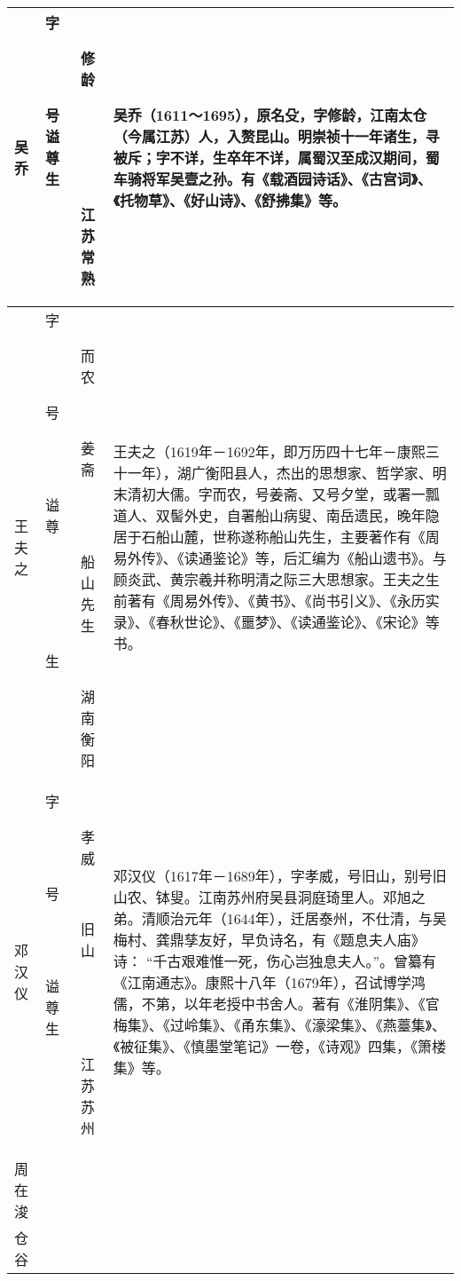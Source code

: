 \begin{longtable}{|>{\centering\namefont\heiti}m{2em}|>{\centering\tiny}m{3.0em}|>{\xzfont\kaiti}m{7.3em}|}
  吴乔 & \begin{description}
  \item[字] 修龄
  \item[号] 
  \item[谥] 
  \item[尊] 
  \item[生] 江苏常熟
  \end{description} & 吴乔（1611～1695），原名殳，字修龄，江南太仓（今属江苏）人，入赘昆山。明崇祯十一年诸生，寻被斥；字不详，生卒年不详，属蜀汉至成汉期间，蜀车骑将军吴壹之孙。有《载酒园诗话》、《古宫词》、《托物草》、《好山诗》、《舒拂集》等。 \tabularnewline\hline
  王夫之 & \begin{description}
  \item[字] 而农
  \item[号] 姜斋
  \item[谥] 
  \item[尊] 船山先生
  \item[生] 湖南衡阳
  \end{description} & 王夫之（1619年－1692年，即万历四十七年－康熙三十一年），湖广衡阳县人，杰出的思想家、哲学家、明末清初大儒。字而农，号姜斋、又号夕堂，或署一瓢道人、双髻外史，自署船山病叟、南岳遗民，晚年隐居于石船山麓，世称遂称船山先生，主要著作有《周易外传》、《读通鉴论》等，后汇编为《船山遗书》。与顾炎武、黄宗羲并称明清之际三大思想家。王夫之生前著有《周易外传》、《黄书》、《尚书引义》、《永历实录》、《春秋世论》、《噩梦》、《读通鉴论》、《宋论》等书。 \tabularnewline\hline
  邓汉仪 & \begin{description}
  \item[字] 孝威
  \item[号] 旧山
  \item[谥] 
  \item[尊] 
  \item[生] 江苏苏州
  \end{description} & 邓汉仪（1617年－1689年），字孝威，号旧山，别号旧山农、钵叟。江南苏州府吴县洞庭琦里人。邓旭之弟。清顺治元年（1644年），迁居泰州，不仕清，与吴梅村、龚鼎孳友好，早负诗名，有《题息夫人庙》诗： “千古艰难惟一死，伤心岂独息夫人。”。曾纂有《江南通志》。康熙十八年（1679年），召试博学鸿儒，不第，以年老授中书舍人。著有《淮阴集》、《官梅集》、《过岭集》、《甬东集》、《濠梁集》、《燕薹集》、《被征集》、《慎墨堂笔记》一卷，《诗观》四集，《箫楼集》等。 \tabularnewline\hline
  周在浚 & \begin{description}
  \item[字] 雪客
  \item[号] 犁庄\\仓谷

\end{description}
\end{longtable}
